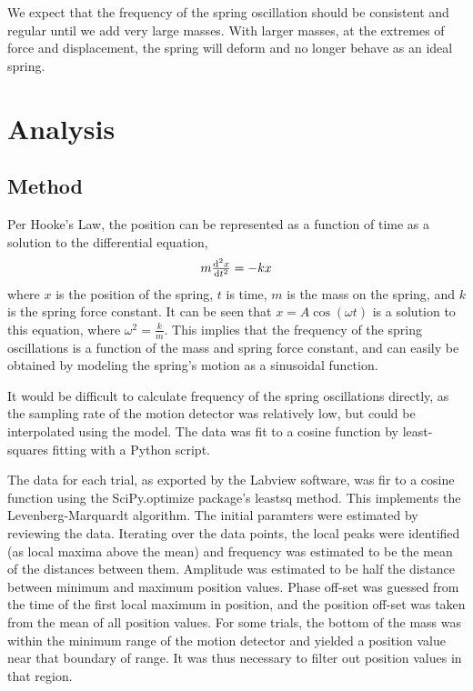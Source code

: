 \documentclass{article}
\numberwithin{figure}{section}
\numberwithin{table}{section}
\begin{document}
We expect that the frequency of the spring oscillation should be consistent and regular until we add very large masses.  With larger masses, at the extremes of force and displacement, the spring will deform and no longer behave as an ideal spring.

\section{Analysis} 

\subsection{Method} 

Per Hooke's Law, the position can be represented as a function of time as a solution to the differential equation, 
\begin{equation} 
	m \od[2]{x}{t} = -kx 
\end{equation} 
where $x$ is the position of the spring, $t$ is time, $m$ is the mass on the spring, and $k$ is the spring force constant.  It can be seen that $x = A \cos \left( \omega t \right)$ is a solution to this equation, where $\omega^2 = \frac{k}{m}$.  This implies that the frequency of the spring oscillations is a function of the mass and spring force constant, and can easily be obtained by modeling the spring's motion as a sinusoidal function.

It would be difficult to calculate frequency of the spring oscillations directly, as the sampling rate of the motion detector was relatively low, but could be interpolated using the model.  The data was fit to a cosine function by least-squares fitting with a Python script.

The data for each trial, as exported by the Labview software, was fir to a cosine function using the SciPy.optimize package's leastsq method.  This implements the Levenberg-Marquardt algorithm.  The initial paramters were estimated by reviewing the data.  Iterating over the data points, the local peaks were identified (as local maxima above the mean) and frequency was estimated to be the mean of the distances between them.  Amplitude was estimated to be half the distance between minimum and maximum position values.  Phase off-set was guessed from the time of the first local maximum in position, and the position off-set was taken from the mean of all position values.  For some trials, the bottom of the mass was within the minimum range of the motion detector and yielded a position value near that boundary of range.  It was thus necessary to filter out position values in that region.
\end{document}
